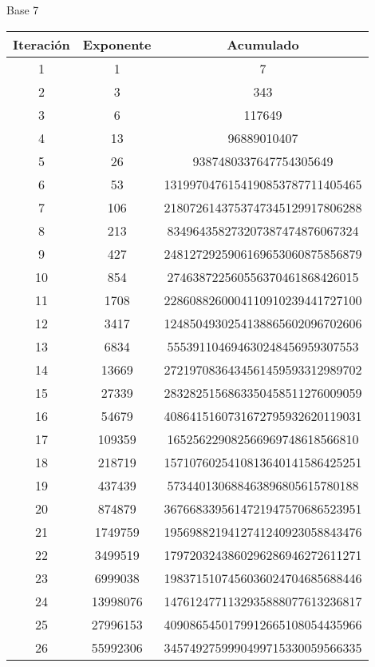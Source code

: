 \documentclass[fleqn]{article}
\begin{document}
\begin{center}
        \newpage Base 7
        \begin{tabular}{c | c | c}
            Iteración & Exponente & Acumulado \\ \hline
            1 & 1 & 7 \\
            2 & 3 & 343 \\
            3 & 6 & 117649 \\
            4 & 13 & 96889010407 \\
            5 & 26 & 9387480337647754305649 \\
            6 & 53 & 1319970476154190853787711405465 \\
            7 & 106 & 2180726143753747345129917806288 \\
            8 & 213 & 834964358273207387474876067324 \\
            9 & 427 & 2481272925906169653060875856879 \\
            10 & 854 & 274638722560556370461868426015 \\
            11 & 1708 & 2286088260004110910239441727100 \\
            12 & 3417 & 1248504930254138865602096702606 \\
            13 & 6834 & 555391104694630248456959307553 \\
            14 & 13669 & 2721970836434561459593312989702 \\
            15 & 27339 & 2832825156863350458511276009059 \\
            16 & 54679 & 4086415160731672795932620119031 \\
            17 & 109359 & 165256229082566969748618566810 \\
            18 & 218719 & 1571076025410813640141586425251 \\
            19 & 437439 & 573440130688463896805615780188 \\
            20 & 874879 & 3676683395614721947570686523951 \\
            21 & 1749759 & 1956988219412741240923058843476 \\
            22 & 3499519 & 1797203243860296286946272611271 \\
            23 & 6999038 & 1983715107456036024704685688446 \\
            24 & 13998076 & 1476124771132935888077613236817 \\
            25 & 27996153 & 4090865450179912665108054435966 \\
            26 & 55992306 & 3457492759990499715330059566335 \\

\end{tabular}
\end{center}
\end{document}
